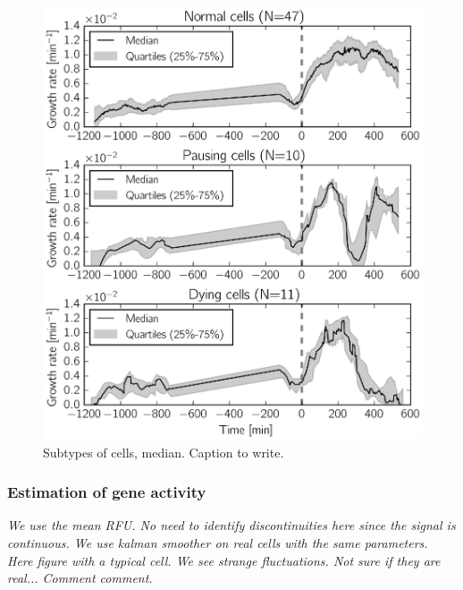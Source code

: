 \begin{figure}[h!]
\centering
\includegraphics[scale=1]{./Fig/subcat_median}
\caption{Subtypes of cells, median. Caption to write.}
\label{fig:subcat_median}
\end{figure}

\subsubsection*{Estimation of gene activity}

\textit{
We use the mean RFU.
No need to identify discontinuities here since the signal is continuous.
We use kalman smoother on real cells with the same parameters.
Here figure with a typical cell.
We see strange fluctuations.
Not sure if they are real...
Comment comment.
}

